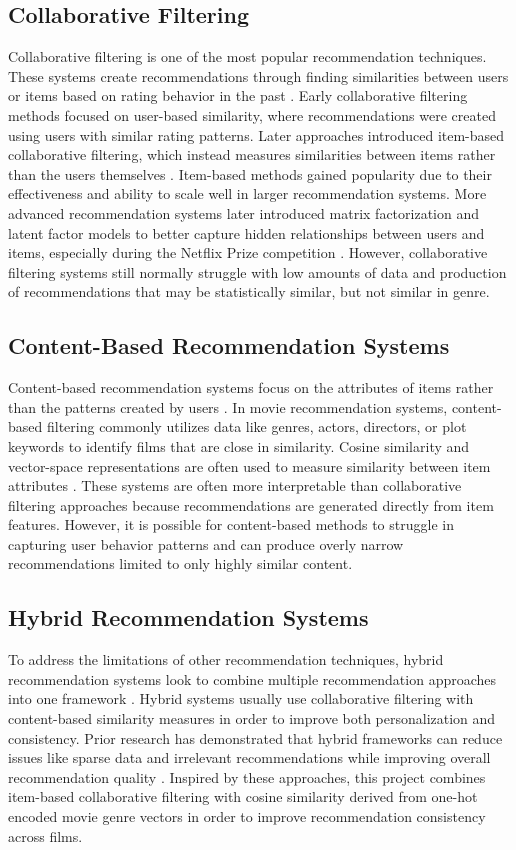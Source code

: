\documentclass{article}
\begin{document}
\subsection{Collaborative Filtering}
Collaborative filtering is one of the most popular recommendation techniques. These systems create recommendations through finding similarities between users or items based on rating behavior in the past \cite{resnick1994grouplens}. Early collaborative filtering methods focused on user-based similarity, where recommendations were created using users with similar rating patterns. Later approaches introduced item-based collaborative filtering, which instead measures similarities between items rather than the users themselves \cite{sarwar2001itembased}. Item-based methods gained popularity due to their effectiveness and ability to scale well in larger recommendation systems. More advanced recommendation systems later introduced matrix factorization and latent factor models to better capture hidden relationships between users and items, especially during the Netflix Prize competition \cite{koren2009matrix,bennett2007netflix}. However, collaborative filtering systems still normally struggle with low amounts of data and production of recommendations that may be statistically similar, but not similar in genre.

\subsection{Content-Based Recommendation Systems}
Content-based recommendation systems focus on the attributes of items rather than the patterns created by users \cite{lops2011contentbased}. In movie recommendation systems, content-based filtering commonly utilizes data like genres, actors, directors, or plot keywords to identify films that are close in similarity. Cosine similarity and vector-space representations are often used to measure similarity between item attributes \cite{salton1975vectorspace}. These systems are often more interpretable than collaborative filtering approaches because recommendations are generated directly from item features. However, it is possible for content-based methods to struggle in capturing user behavior patterns and can produce overly narrow recommendations limited to only highly similar content.

\subsection{Hybrid Recommendation Systems}
To address the limitations of other recommendation techniques, hybrid recommendation systems look to combine multiple recommendation approaches into one framework \cite{burke2002hybrid}. Hybrid systems usually use collaborative filtering with content-based similarity measures in order to improve both personalization and consistency. Prior research has demonstrated that hybrid frameworks can reduce issues like sparse data and irrelevant recommendations while improving overall recommendation quality \cite{adomavicius2005toward}. Inspired by these approaches, this project combines item-based collaborative filtering with cosine similarity derived from one-hot encoded movie genre vectors in order to improve recommendation consistency across films.
\end{document}
